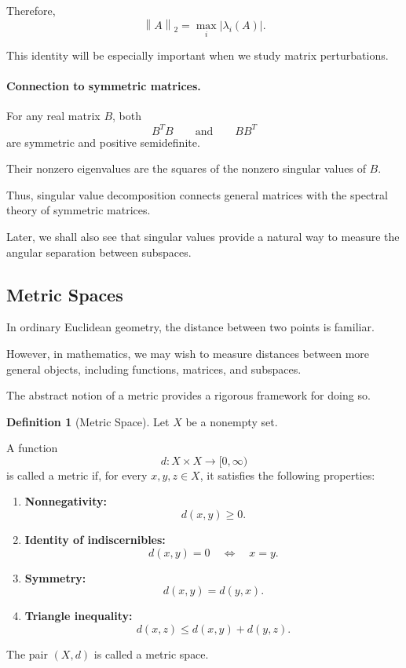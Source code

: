 \documentclass[14pt,letterpaper]{article}
\theoremstyle{plain}
\theoremstyle{definition}
\newtheorem{definition}[theorem]{Definition}
\theoremstyle{remark}
\newcommand{\norm}[1]{\left\lVert #1 \right\rVert}
\begin{document}
Therefore,
\[
\boxed{
\norm{A}_2
=
\max_i|\lambda_i(A)|.
}
\]

This identity will be especially important
when we study matrix perturbations.

\paragraph{Connection to symmetric matrices.}

For any real matrix $B$, both
\[
B^TB
\qquad\text{and}\qquad
BB^T
\]
are symmetric and positive semidefinite.

Their nonzero eigenvalues are the squares
of the nonzero singular values of $B$.

Thus, singular value decomposition connects
general matrices with the spectral theory
of symmetric matrices.

Later, we shall also see that singular values
provide a natural way to measure the
angular separation between subspaces.


\subsection{Metric Spaces}
\label{subsec:metric_background}

In ordinary Euclidean geometry, the distance
between two points is familiar.

However, in mathematics, we may wish to
measure distances between more general objects,
including functions, matrices, and subspaces.

The abstract notion of a metric provides
a rigorous framework for doing so.

\begin{definition}[Metric Space]
Let $X$ be a nonempty set.

A function
\[
d:X\times X\longrightarrow[0,\infty)
\]
is called a metric if, for every
$x,y,z\in X$, it satisfies the following
properties:

\begin{enumerate}[label=(\roman*)]

\item \textbf{Nonnegativity:}
\[
d(x,y)\geq0.
\]

\item \textbf{Identity of indiscernibles:}
\[
d(x,y)=0
\quad\Longleftrightarrow\quad
x=y.
\]

\item \textbf{Symmetry:}
\[
d(x,y)=d(y,x).
\]

\item \textbf{Triangle inequality:}
\[
d(x,z)\leq d(x,y)+d(y,z).
\]

\end{enumerate}

The pair $(X,d)$ is called a metric space.
\end{definition}
\end{document}
